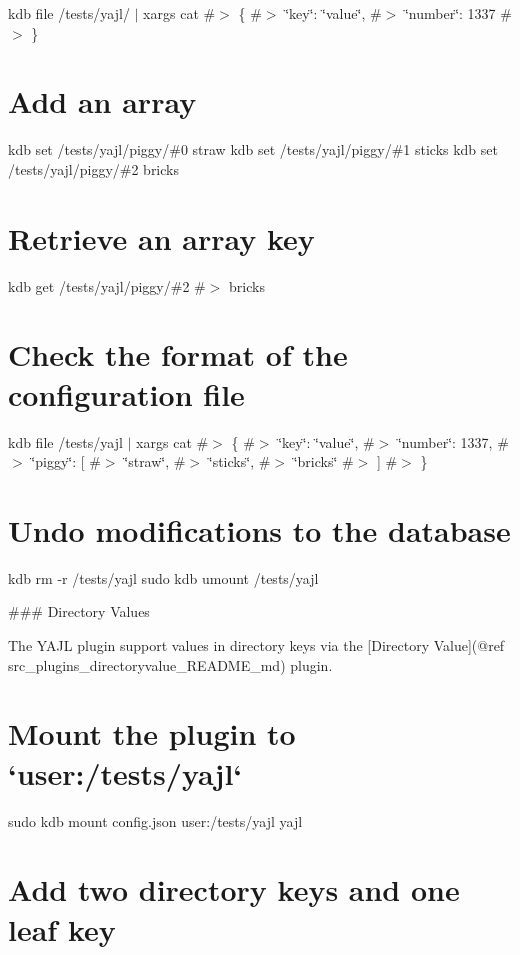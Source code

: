kdb file /tests/yajl/ $\vert$ xargs cat \#$>$ \{ \#$>$ \char`\"{}key\char`\"{}\+: \char`\"{}value\char`\"{}, \#$>$ \char`\"{}number\char`\"{}\+: 1337 \#$>$ \}\hypertarget{autotoc_md777_autotoc_md791}{}\section{Add an array}\label{autotoc_md777_autotoc_md791}
kdb set /tests/yajl/piggy/\#0 straw kdb set /tests/yajl/piggy/\#1 sticks kdb set /tests/yajl/piggy/\#2 bricks\hypertarget{autotoc_md777_autotoc_md792}{}\section{Retrieve an array key}\label{autotoc_md777_autotoc_md792}
kdb get /tests/yajl/piggy/\#2 \#$>$ bricks\hypertarget{autotoc_md777_autotoc_md793}{}\section{Check the format of the configuration file}\label{autotoc_md777_autotoc_md793}
kdb file /tests/yajl $\vert$ xargs cat \#$>$ \{ \#$>$ \char`\"{}key\char`\"{}\+: \char`\"{}value\char`\"{}, \#$>$ \char`\"{}number\char`\"{}\+: 1337, \#$>$ \char`\"{}piggy\char`\"{}\+: \mbox{[} \#$>$ \char`\"{}straw\char`\"{}, \#$>$ \char`\"{}sticks\char`\"{}, \#$>$ \char`\"{}bricks\char`\"{} \#$>$ \mbox{]} \#$>$ \}\hypertarget{autotoc_md777_autotoc_md794}{}\section{Undo modifications to the database}\label{autotoc_md777_autotoc_md794}
kdb rm -\/r /tests/yajl sudo kdb umount /tests/yajl 
\begin{DoxyCode}
### Directory Values

The YAJL plugin support values in directory keys via the [Directory Value](@ref
       src\_plugins\_directoryvalue\_README\_md) plugin.
\end{DoxyCode}
 \hypertarget{autotoc_md777_autotoc_md795}{}\section{Mount the plugin to `user\+:/tests/yajl`}\label{autotoc_md777_autotoc_md795}
sudo kdb mount config.\+json user\+:/tests/yajl yajl\hypertarget{autotoc_md777_autotoc_md796}{}\section{Add two directory keys and one leaf key}\label{autotoc_md777_autotoc_md796}
